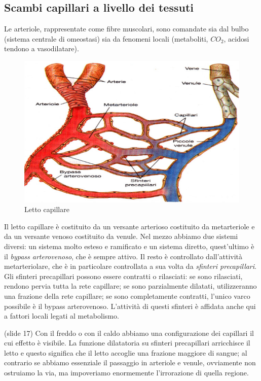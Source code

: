 \documentclass[a4paper,12pt]{article}
\begin{document}
\subsection{Scambi capillari a livello dei tessuti}
 Le arteriole, rappresentate come fibre muscolari, sono comandate sia dal bulbo (sistema centrale di omeostasi) sia da fenomeni locali (metaboliti, $CO_{2}$, acidosi tendono a vasodilatare).
\begin{figure}[H]
\centering
\includegraphics[scale=0.35]{immagine/capill.jpg}
\caption{Letto capillare}
\end{figure}

Il letto capillare è costituito da un versante arterioso costituito da metarteriole e da un versante venoso costituito da venule. Nel mezzo abbiamo due sistemi diversi: un sistema molto esteso e ramificato e un sistema diretto, quest'ultimo è il \emph{bypass arterovenoso}, che è sempre attivo. Il resto è controllato dall'attività metarteriolare, che è in particolare controllata a sua volta da \emph{sfinteri precapillari}. Gli sfinteri precapillari possono essere contratti o rilasciati: se sono rilasciati, rendono pervia tutta la rete capillare; se sono parzialmente dilatati, utilizzeranno una frazione della rete capillare; se sono completamente contratti, l'unico varco possibile è il bypass arterovenoso. L'attività di questi sfinteri è affidata anche qui a fattori locali legati al metabolismo.

(slide 17) Con il freddo o con il caldo abbiamo una configurazione dei capillari il cui effetto è visibile. La funzione dilatatoria su sfinteri precapillari arricchisce il letto e questo significa che il letto accoglie una frazione maggiore di sangue; al contrario se abbiamo essenziale il passaggio in arteriole e venule, ovviamente non ostruiamo la via, ma impoveriamo enormemente l'irrorazione di quella regione. 
\end{document}
